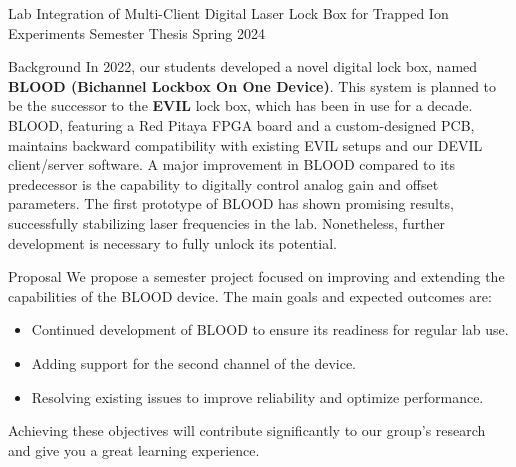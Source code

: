 \documentclass{project-proposal}
\begin{document}
\setmaintextfont
\makepage

\makeheader
{Lab Integration of Multi-​Client Digital Laser Lock Box for Trapped Ion Experiments} %
{Semester Thesis} %
{Spring 2024} %

\begin{section}{Background}
 In 2022, our students developed a novel digital lock box, named
 \textbf{BLOOD (Bichannel Lockbox On One Device)}. This system is planned to be the
 successor to the \textbf{EVIL} lock box, which has been in use for a
 decade. BLOOD, featuring a Red Pitaya FPGA board and a custom-designed PCB,
 maintains backward compatibility with existing EVIL setups and our DEVIL client/server
 software. A major improvement in BLOOD compared to its predecessor is the
 capability to digitally control analog gain and offset parameters. The first prototype
 of BLOOD has shown promising results, successfully stabilizing laser frequencies in
 the lab. Nonetheless, further development is necessary to fully unlock its potential.
\end{section}

\begin{section}{Proposal}
 We propose a semester project focused on improving and extending the
 capabilities of the BLOOD device. The main goals and expected outcomes are:

 \begin{itemize}
     \item {Continued development of BLOOD to ensure its readiness for regular lab use.}
     \item {Adding support for the second channel of the device.}
     \item {Resolving existing issues to improve reliability and optimize performance.}
 \end{itemize}

 Achieving these objectives will contribute significantly to our group's research and
 give you a great learning experience.
\end{section}
\end{document}
